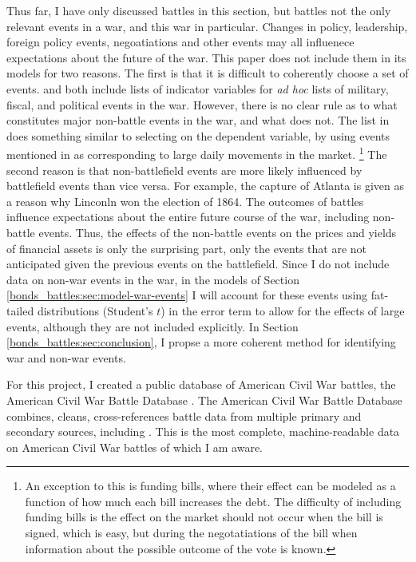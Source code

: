 Thus far, I have only discussed battles in this section, but battles not the only relevant events in a war, and this war in particular.
Changes in policy, leadership, foreign policy events, negoatiations and other events may all influenece expectations about the future of the war.
This paper does not include them in its models for two reasons. 
The first is that it is difficult to coherently choose a set of events. 
\textcite{McCandless1996} and \textcite{SmithSmith1997} both include lists of indicator variables for \textit{ad hoc} lists of military, fiscal, and political events in the war.
However, there is no clear rule as to what constitutes major non-battle events in the war, and what does not.
The list in \textcite{SmithSmith1997} does something similar to selecting on the dependent variable, by using events mentioned in \textcite{Mitchell1903} as corresponding to large daily movements in the market.%
\footnote{
  An exception to this is funding bills, where their effect can be modeled as a function of how much each bill increases the debt.
  The difficulty of including funding bills is the effect on the market should not occur when the bill is signed, which is easy, but during the negotatiations of the bill when information about the possible outcome of the vote is known.
}
The second reason is that non-battlefield events are more likely influenced by battlefield events than vice versa. 
For example, the capture of Atlanta is given as a reason why Linconln won the election of 1864.
The outcomes of battles influence expectations about the entire future course of the war, including non-battle events. 
Thus, the effects of the non-battle events on the prices and yields of financial assets is only the surprising part, only the events that are not anticipated given the previous events on the battlefield.
Since I do not include data on non-war events in the war, in the models of Section \ref{bonds_battles:sec:model-war-events} I will account for these events using fat-tailed distributions (Student's $t$) in the error term to allow for the effects of large events, although they are not included explicitly.
In Section \ref{bonds_battles:sec:conclusion}, I propse a more coherent method for identifying war and non-war events.

For this project, I created a public database of American Civil War battles, the American Civil War Battle Database \parencite{Arnold2015b}.
The American Civil War Battle Database combines, cleans, cross-references battle data from multiple primary and secondary sources, including \textcites{Phisterer1883}{Livermore1900}{Bodart1908}{dyer1908_war_rebel}{KennedyConservation1998}{CWSAC1993}{cwsac2012}.
This is the most complete, machine-readable data on American Civil War battles of which I am aware.

